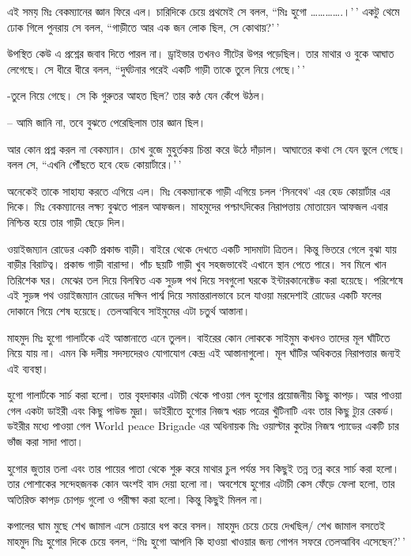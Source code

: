 \documentclass[
]{book}
\begin{document}
এই সময় মিঃ বেকম্যানের জ্ঞান ফিরে এল। চারিদিকে চেয়ে প্রথমেই সে বলল, ``মিঃ হুগো \ldots\ldots\ldots\ldots.।'\,' একটু থেমে ঢোক গিলে পুনরায় সে বলল, ``গাড়ীতে আর এক জন লোক ছিল, সে কোথায়?'\,'

উপস্থিত কেউ এ প্রশ্নের জবাব দিতে পারল না। ড্রাইভার তখনও সীটের উপর পড়েছিল। তার মাথার ও বুকে আঘাত লেগেছে। সে ধীরে ধীরে বলল, ``দুর্ঘটনার পরেই একটি গাড়ী তাকে তুলে নিয়ে গেছে।'\,'

-তুলে নিয়ে গেছে। সে কি গুরুতর আহত ছিল? তার কণ্ঠ যেন কেঁপে উঠল।

-- আমি জানি না, তবে বুঝতে পেরেছিলাম তার জ্ঞান ছিল।

আর কোন প্রশ্ন করল না বেকম্যান। চোখ বুজে মুহুর্তকয় চিন্তা করে উঠে দাঁড়াল। আঘাতের কথা সে যেন ভুলে গেছে। বলল সে, ``এখনি পৌঁছতে হবে হেড কোয়ার্টারে।'\,'

অনেকেই তাকে সাহায্য করতে এগিয়ে এল। মিঃ বেকম্যানকে গাড়ী এগিয়ে চলল `সিনবেথ' এর হেড কোয়ার্টার এর দিকে। মিঃ বেকম্যানের লক্ষ্য বুঝতে পারল আফজল। মাহমুদের পশ্চাৎদিকের নিরাপত্তায় মোতায়েন আফজল এবার নিশ্চিন্ত হয়ে তার গাড়ী ছেড়ে দিল।

ওয়াইজম্যান রোডের একটি প্রকান্ড বাড়ী। বাইরে থেকে দেখতে একটি সাদমাটা ত্রিতল। কিন্তু ভিতরে গেলে বুঝা যায় বাড়ীর বিরাটত্ব। প্রকান্ড গাড়ী বারান্দা। পাঁচ ছয়টি গাড়ী খুব সহজভাবেই এখানে স্থান পেতে পারে। সব মিলে খান তিরিশেক ঘর। মেঝের তল দিয়ে বিলম্বিত এক সুড়ঙ্গ পথ দিয়ে সবগুলো ঘরকে ইন্টারকানেক্টেড করা হয়েছে। পরিশেষে এই সুড়ঙ্গ পথ ওয়াইজম্যান রোডের দক্ষিন পার্শ্ব দিয়ে সমান্তরালভাবে চলে যাওয়া মরদেশাই রোডের একটি ফলের দোকানে গিয়ে শেষ হয়েছে। তেলআবিবে সাইমুমের এটা চতুর্থ আস্তানা।

মাহমুদ মিঃ হুগো গালার্টকে এই আস্তানাতে এনে তুলল। বাইরের কোন লোককে সাইমুম কখনও তাদের মূল ঘাঁটিতে নিয়ে যায় না। এমন কি দলীয় সদস্যদেরও যোগাযোগ কেন্দ্র এই আস্তানাগুলো। মূল ঘাঁটির অধিকতর নিরাপত্তার জন্যই এই ব্যবস্থা।

হুগো গালার্টকে সার্চ করা হলো। তার বৃহদাকার এটাচী থেকে পাওয়া গেল হুগোর প্রয়োজনীয় কিছু কাপড়। আর পাওয়া গেল একটা ডাইরী এবং কিছু পাউন্ড মুদ্রা। ডাইরীতে হুগোর নিজস্ব খরচ পত্রের খুঁটিনাটি এবং তার কিছু ট্যুর রেকর্ড। ডইরীর মধ্যে পাওয়া গেল World peace Brigade এর অধিনায়ক মিঃ ওয়াল্টার কুটের নিজস্ব প্যাডের একটি চার ভাঁজ করা সাদা পাতা।

হুগোর জুতার তলা এবং তার পায়ের পাতা থেকে শুরু করে মাথার চুল পর্যন্ত সব কিছুই তন্ন তন্ন করে সার্চ করা হলো। তার পোশাকের সন্দেহজনক কোন অংশই বাদ দেয়া হলো না। অবশেষে হুগোর এটাচী কেস ফেঁড়ে ফেলা হলো, তার অতিরিক্ত কাপড় চোপড় গুলো ও পরীক্ষা করা হলো। কিন্তু কিছুই মিলল না।

কপালের ঘাম মুছে শেখ জামাল এসে চেয়ারে ধপ করে বসল। মাহমুদ চেয়ে চেয়ে দেখছিল/ শেখ জামাল বসতেই মাহমুদ মিঃ হুগোর দিকে চেয়ে বলল, ``মিঃ হুগো আপনি কি হাওয়া খাওয়ার জন্য গোপন সফরে তেলআবিব এসেছেন?'\,'
\end{document}
